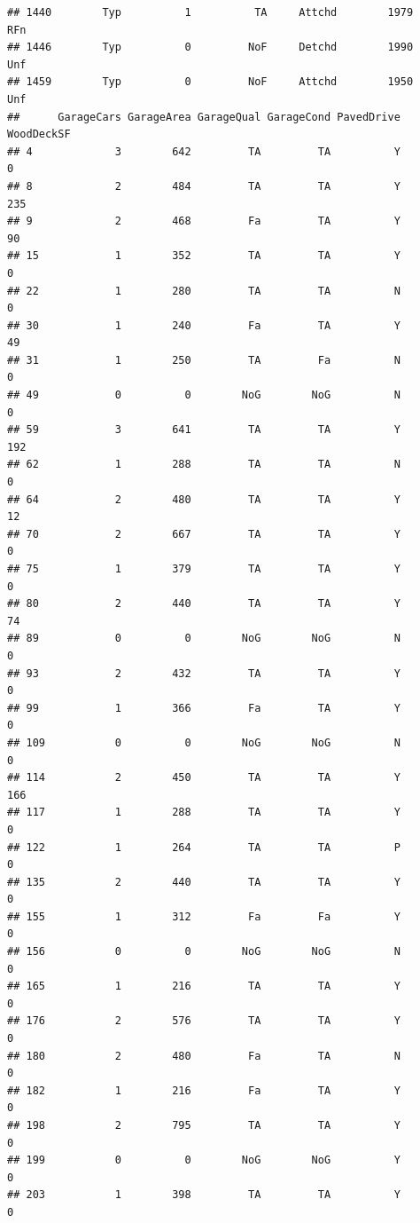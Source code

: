 \documentclass[]{article}
\begin{document}
\begin{verbatim}
## 1440        Typ          1          TA     Attchd        1979          RFn
## 1446        Typ          0         NoF     Detchd        1990          Unf
## 1459        Typ          0         NoF     Attchd        1950          Unf
##      GarageCars GarageArea GarageQual GarageCond PavedDrive WoodDeckSF
## 4             3        642         TA         TA          Y          0
## 8             2        484         TA         TA          Y        235
## 9             2        468         Fa         TA          Y         90
## 15            1        352         TA         TA          Y          0
## 22            1        280         TA         TA          N          0
## 30            1        240         Fa         TA          Y         49
## 31            1        250         TA         Fa          N          0
## 49            0          0        NoG        NoG          N          0
## 59            3        641         TA         TA          Y        192
## 62            1        288         TA         TA          N          0
## 64            2        480         TA         TA          Y         12
## 70            2        667         TA         TA          Y          0
## 75            1        379         TA         TA          Y          0
## 80            2        440         TA         TA          Y         74
## 89            0          0        NoG        NoG          N          0
## 93            2        432         TA         TA          Y          0
## 99            1        366         Fa         TA          Y          0
## 109           0          0        NoG        NoG          N          0
## 114           2        450         TA         TA          Y        166
## 117           1        288         TA         TA          Y          0
## 122           1        264         TA         TA          P          0
## 135           2        440         TA         TA          Y          0
## 155           1        312         Fa         Fa          Y          0
## 156           0          0        NoG        NoG          N          0
## 165           1        216         TA         TA          Y          0
## 176           2        576         TA         TA          Y          0
## 180           2        480         Fa         TA          N          0
## 182           1        216         Fa         TA          Y          0
## 198           2        795         TA         TA          Y          0
## 199           0          0        NoG        NoG          Y          0
## 203           1        398         TA         TA          Y          0

\end{verbatim}
\end{document}

